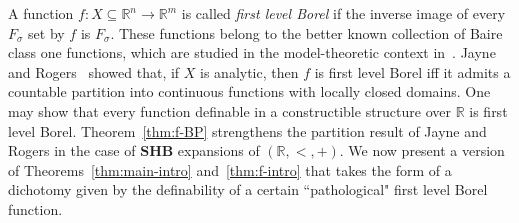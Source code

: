 \documentclass[12pt]{article}
\newcommand{\BP}{\textbf{SHB}}
\newcommand{\R}{\mathbb{R}}
\theoremstyle{definition}
\theoremstyle{remark}
\begin{document}

A function $f:X\subseteq \R^n\rightarrow \R^m$ is called \emph{first level Borel} if the inverse image of every $F_\sigma$ set by $f$ is $F_\sigma$. These functions belong to the better known collection of Baire class one functions, which are studied in the model-theoretic context in~\cite{comp-set}. Jayne and Rogers~\cite{Jayne-Rogers} showed that, if $X$ is analytic, then $f$ is first level Borel iff it admits a countable partition into continuous functions with locally closed domains. One may show that every function definable in a constructible structure over $\R$ is first level Borel. Theorem~\ref{thm:f-BP} strengthens the partition result of Jayne and Rogers in the case of $\BP$ expansions of $(\R,<,+)$. We now present a version of Theorems~\ref{thm:main-intro} and~\ref{thm:f-intro} that takes the form of a dichotomy given by the definability of a certain ``pathological" first level Borel function. 
\end{document}
